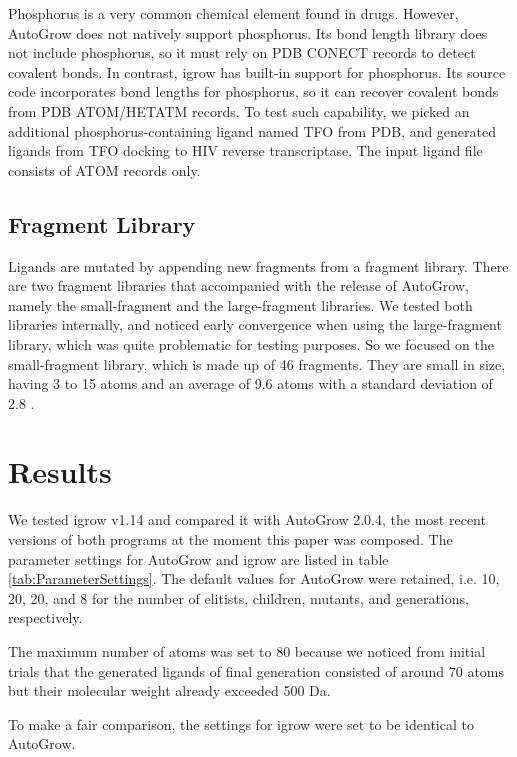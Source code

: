 \documentclass[10pt, conference, compsocconf]{IEEEtran}
\begin{document}
Phosphorus is a very common chemical element found in drugs. However, AutoGrow does not natively support phosphorus. Its bond length library does not include phosphorus, so it must rely on PDB CONECT records to detect covalent bonds. In contrast, igrow has built-in support for phosphorus. Its source code incorporates bond lengths for phosphorus, so it can recover covalent bonds from PDB ATOM/HETATM records. To test such capability, we picked an additional phosphorus-containing ligand named TFO from PDB, and generated ligands from TFO docking to HIV reverse transcriptase. The input ligand file consists of ATOM records only.

\subsection{Fragment Library}

Ligands are mutated by appending new fragments from a fragment library. There are two fragment libraries that accompanied with the release of AutoGrow, namely the small-fragment and the large-fragment libraries. We tested both libraries internally, and noticed early convergence when using the large-fragment library, which was quite problematic for testing purposes. So we focused on the small-fragment library, which is made up of 46 fragments. They are small in size, having 3 to 15 atoms and an average of 9.6 atoms with a standard deviation of 2.8 \cite{114}.

\section{Results}

We tested igrow v1.14 and compared it with AutoGrow 2.0.4, the most recent versions of both programs at the moment this paper was composed. The parameter settings for AutoGrow and igrow are listed in table \ref{tab:ParameterSettings}. The default values for AutoGrow were retained, i.e. 10, 20, 20, and 8 for the number of elitists, children, mutants, and generations, respectively.

The maximum number of atoms was set to 80 because we noticed from initial trials that the generated ligands of final generation consisted of around 70 atoms but their molecular weight already exceeded 500 Da.

To make a fair comparison, the settings for igrow were set to be identical to AutoGrow.
\end{document}
